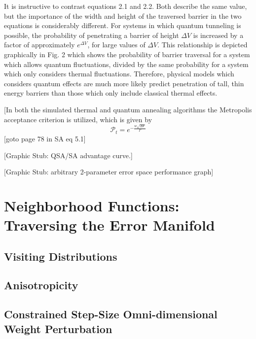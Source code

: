 \documentclass[11pt]{afthesis}
\begin{document}
	It is instructive to contrast equations 2.1 and 2.2. Both describe the same value, but the importance of the width and height of the traversed barrier in the two equations is considerably different. For systems in which quantum tunneling is possible, the probability of penetrating a barrier of height \begin{math} \Delta V \end{math} is increased by a factor of approximately \begin{math} e^{\Delta V} \end{math}, for large values of \begin{math} \Delta V \end{math}. This relationship is depicted graphically in Fig. 2 which shows the probability of barrier traversal for a system which allows quantum fluctuations, divided by the same probability for a system which only considers thermal fluctuations. Therefore, physical models which considers quantum effects are much more likely predict penetration of tall, thin energy barriers than those which only include classical thermal effects.
	
	[In both the simulated thermal and quantum annealing algorithms the Metropolis acceptance criterion is utilized, which is given by \begin{equation}
	\mathcal{P}_t = e^{-\frac{w \sqrt{\Delta V}}{ \Gamma}} 
	\end{equation}[goto page 78 in SA eq 5.1] 
	
	
	[Graphic Stub: QSA/SA advantage curve.] 
	
	[Graphic Stub: arbitrary 2-parameter error space performance graph]
	
	\section{Neighborhood Functions: Traversing the Error Manifold}
	
	\subsection{Visiting Distributions}
	
	\subsection{Anisotropicity}
	
	\subsection{Constrained Step-Size Omni-dimensional Weight Perturbation}
	
\end{document}
